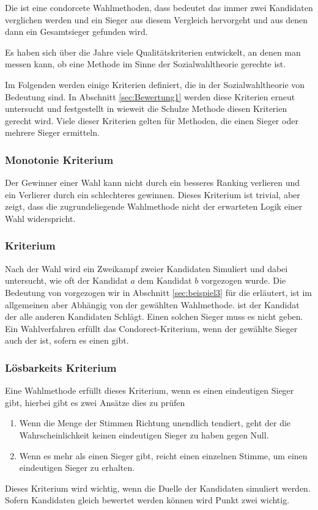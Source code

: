 Die \schulze ist eine condorcete Wahlmethoden, dass bedeutet das immer zwei Kandidaten verglichen werden und ein Sieger aus diesem Vergleich hervorgeht und aus denen dann ein Gesamtsieger gefunden wird. 

Es haben sich über die Jahre viele Qualitätskriterien entwickelt, an denen man messen kann, ob eine Methode im Sinne der Sozialwahltheorie gerechte ist.

Im Folgenden werden einige Kriterien definiert, die in der Sozialwahltheorie von Bedeutung sind. In Abschnitt \ref{sec:Bewertung1} werden diese Kriterien erneut untersucht und festgestellt in wieweit die Schulze Methode diesen Kriterien gerecht wird. Viele dieser Kriterien gelten für Methoden, die einen Sieger oder mehrere Sieger ermitteln. 

\subsubsection{Monotonie Kriterium} 
\label{sec:monotoniekriterium}
Der Gewinner einer Wahl kann nicht durch ein besseres Ranking verlieren und ein Verlierer durch ein schlechteres gewinnen. \citep{Woodall1996} Dieses Kriterium ist trivial, aber zeigt, dass die zugrundeliegende Wahlmethode nicht der erwarteten Logik einer Wahl widerspricht.

\subsubsection{\condorcet Kriterium} 
\label{sec:condorectKriterium}
Nach der Wahl wird ein Zweikampf zweier Kandidaten Simuliert und dabei untersucht, wie oft der Kandidat $a$ dem Kandidat $b$ vorgezogen wurde. Die Bedeutung von \glqq vorgezogen\grqq{} wir in Abschnitt \ref{sec:beispiel3} für die \schulze erläutert, ist im allgemeinen aber Abhängig von der gewählten Wahlmethode. \condorcetSieger ist der Kandidat der alle anderen Kandidaten Schlägt. Einen solchen Sieger muss es nicht geben. Ein Wahlverfahren erfüllt das Condorect-Kriterium, wenn der gewählte Sieger auch der \condorcetSieger ist, sofern es einen \condorcetSieger gibt. \citep{Johnson2005}

\subsubsection{Lösbarkeits Kriterium} 
\label{sec:loesbarkeitsKriterium}
Eine Wahlmethode erfüllt dieses Kriterium, wenn es einen eindeutigen Sieger gibt, hierbei gibt es zwei Ansätze dies zu prüfen \citep{Schulze2017}
\begin{enumerate}
\item Wenn die Menge der Stimmen Richtung unendlich tendiert, geht der die Wahrscheinlichkeit keinen eindeutigen Sieger zu haben gegen Null.
\item Wenn es mehr als einen Sieger gibt, reicht einen einzelnen Stimme, um einen eindeutigen Sieger zu erhalten.
\end{enumerate}
Dieses Kriterium wird wichtig, wenn die Duelle der Kandidaten simuliert werden. Sofern Kandidaten gleich bewertet werden können wird Punkt zwei wichtig.

